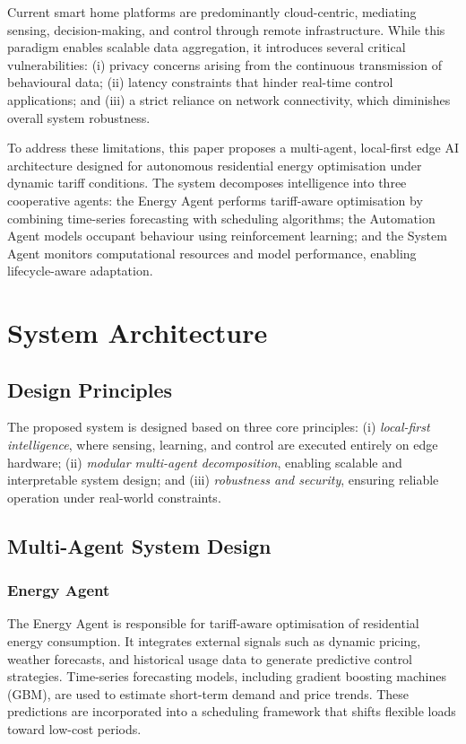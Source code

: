 \documentclass[11pt,a4paper]{article}
\begin{document}
Current smart home platforms are predominantly cloud-centric, mediating sensing, decision-making, and control through remote infrastructure. While this paradigm enables scalable data aggregation, it introduces several critical vulnerabilities: (i) privacy concerns arising from the continuous transmission of behavioural data; (ii) latency constraints that hinder real-time control applications; and (iii) a strict reliance on network connectivity, which diminishes overall system robustness.

To address these limitations, this paper proposes a multi-agent, local-first edge AI architecture designed for autonomous residential energy optimisation under dynamic tariff conditions. The system decomposes intelligence into three cooperative agents: the Energy Agent performs tariff-aware optimisation by combining time-series forecasting with scheduling algorithms; the Automation Agent models occupant behaviour using reinforcement learning; and the System Agent monitors computational resources and model performance, enabling lifecycle-aware adaptation.

\section{System Architecture}
\label{sec:architecture}

\subsection{Design Principles}

The proposed system is designed based on three core principles: (i) \textit{local-first intelligence}, where sensing, learning, and control are executed entirely on edge hardware; (ii) \textit{modular multi-agent decomposition}, enabling scalable and interpretable system design; and (iii) \textit{robustness and security}, ensuring reliable operation under real-world constraints.

\subsection{Multi-Agent System Design}

\subsubsection{Energy Agent}

The Energy Agent is responsible for tariff-aware optimisation of residential energy consumption. It integrates external signals such as dynamic pricing, weather forecasts, and historical usage data to generate predictive control strategies. Time-series forecasting models, including gradient boosting machines (GBM), are used to estimate short-term demand and price trends. These predictions are incorporated into a scheduling framework that shifts flexible loads toward low-cost periods.
\end{document}
